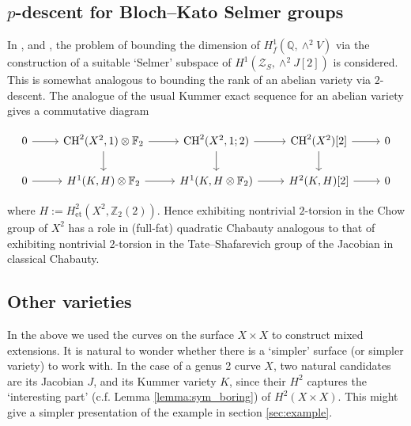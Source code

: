 \documentclass[11pt]{amsart}
\def\Z{\mathbb Z}
\def\Q{\mathbb Q}
\def\F{\mathbb F}
\theoremstyle{plain}
\theoremstyle{definition}
\newcommand{\CH}{\mathrm{CH}}
\newcommand{\et}{\mathrm{et}}
\begin{document}
\subsection{$p$-descent for Bloch--Kato Selmer groups}
In \cite{dogra2023}, \cite{dogra20242} and \cite{berry2025refined}, the problem of bounding the dimension of $H^1 _f (\Q ,\wedge ^2 V)$ via the construction of a suitable `Selmer' subspace of $H^1 (\mathcal{Z}_S ,\wedge ^2 J[2])$ is considered. This is somewhat analogous to bounding the rank of an abelian variety via $2$-descent. The analogue of the usual Kummer exact sequence for an abelian variety gives a commutative diagram
\begin{small}
\[
\begin{tikzcd}
0 \arrow[r]  & \CH ^2 (X^2 ,1)\otimes \F _2 \arrow[d] \arrow[r] & \CH ^2 (X^2 ,1;2) \arrow[d] \arrow[r] & \CH ^2 (X^2 )[2] \arrow[d] \arrow[r] & 0 \\
0 \arrow[r] & H^1 (K,H)\otimes \F _2 \arrow[r] &  H^1 (K,H\otimes \F _2 )   \arrow[r]  & H^2 (K,H)[2] \arrow[r]     & 0
\end{tikzcd}
\]
\end{small}
where $H:=H^2 _{\et }(X^2 ,\Z _2 (2))$. Hence exhibiting nontrivial $2$-torsion in the Chow group of $X^2 $ has a role in (full-fat) quadratic Chabauty analogous to that of exhibiting nontrivial $2$-torsion in the Tate--Shafarevich group of the Jacobian in classical Chabauty.
\subsection{Other varieties}
In the above we used the curves on the surface $X\times X$ to construct mixed extensions. It is natural to wonder whether there is a `simpler' surface (or simpler variety) to work with. In the case of a genus 2 curve $X$, two natural candidates are its Jacobian $J$, and its Kummer variety $K$, since their $H^2$ captures the `interesting part' (c.f. Lemma \ref{lemma:sym_boring}) of $H^2 (X\times X)$. This might give a simpler presentation of the example in section \ref{sec:example}.


\end{document}
